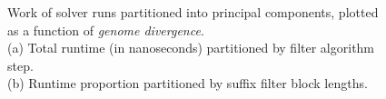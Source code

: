\begin{figure}
\centering
{}
\caption[Work time of \aspop{} solver runs partitioned into principal components, plotted as a function of \textit{genome divergence}]{Work of \aspop{} solver runs partitioned into principal components, plotted as a function of \textit{genome divergence}.\\(a) Total runtime (in nanoseconds) partitioned by filter algorithm step.\\(b) Runtime proportion partitioned by suffix filter block lengths.}
\label{fig:div}
\end{figure}

